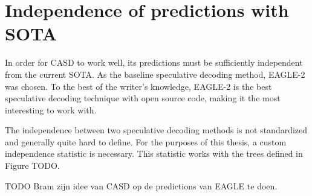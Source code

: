 \section{Independence of predictions with SOTA}
In order for CASD to work well, its predictions must be sufficiently independent from the current SOTA. As the baseline speculative decoding method, EAGLE-2 was chosen. To the best of the writer's knowledge, EAGLE-2 is the best speculative decoding technique with open source code, making it the most interesting to work with. 

The independence between two speculative decoding methods is not standardized and generally quite hard to define. For the purposes of this thesis, a custom independence statistic is necessary. This statistic works with the trees defined in Figure TODO.

TODO Bram zijn idee van CASD op de predictions van EAGLE te doen.
\section{}